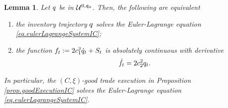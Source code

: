 \documentclass[10pt,a4paper]{article}
\newtheorem{lemma}[thm]{Lemma}
\begin{document}
	\begin{lemma}
		\label{lemma.characterisationEulerLagrangeIC}
		Let $q$ be in $\mathcal{U}^{0,\mathfrak{q_0}}$. Then, the following are equivalent
		\begin{enumerate}
			\item the inventory trajectory $q$ solves the Euler-Lagrange equation \eqref{eq.eulerLagrangeSystemIC};
			\item the function $f_t:= 2c_{1}^{2} \dot{q}_t + S_t$ is absolutely continuous with derivative 
			\begin{equation*}
			\dot{f}_t = 2 c_{2}^{2} q_t. 
			\end{equation*}
		\end{enumerate}
		In particular, the $(C,\xi)$-good trade execution in Proposition \ref{prop.goodExecutionIC} solves the Euler-Lagrange equation \eqref{eq.eulerLagrangeSystemIC}. 
	\end{lemma}
\end{document}
